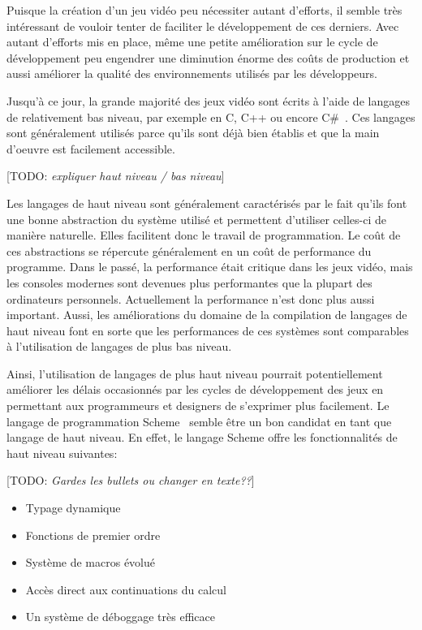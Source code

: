 \documentclass[12pt,oneside,letterpaper,francais]{book}
\newcommand{\todo}[1]{[TODO: {\it #1}]}
\begin{document}
Puisque la création d'un jeu vidéo peu nécessiter autant d'efforts, il
semble très intéressant de vouloir tenter de faciliter le
développement de ces derniers. Avec autant d'efforts mis en place,
même une petite amélioration sur le cycle de développement peu
engendrer une diminution énorme des coûts de production et aussi
améliorer la qualité des environnements utilisés par les développeurs.

Jusqu'à ce jour, la grande majorité des jeux vidéo sont écrits à
l'aide de langages de relativement bas niveau, par exemple en C, C++
ou encore C\#~\cite{CSHARP_SPEC}. Ces langages sont généralement
utilisés parce qu'ils sont déjà bien établis et que la main d'oeuvre
est facilement accessible.

\todo{expliquer haut niveau / bas niveau}

Les langages de haut niveau sont généralement caractérisés par le fait
qu'ils font une bonne abstraction du système utilisé et permettent
d'utiliser celles-ci de manière naturelle. Elles facilitent donc le
travail de programmation. Le coût de ces abstractions se répercute
généralement en un coût de performance du programme. Dans le passé, la
performance était critique dans les jeux vidéo, mais les consoles
modernes sont devenues plus performantes que la plupart des
ordinateurs personnels. Actuellement la performance n'est donc plus
aussi important. Aussi, les améliorations du domaine de la compilation
de langages de haut niveau font en sorte que les performances de ces
systèmes sont comparables à l'utilisation de langages de plus bas
niveau.

Ainsi, l'utilisation de langages de plus haut niveau pourrait
potentiellement améliorer les délais occasionnés par les cycles de
développement des jeux en permettant aux programmeurs et designers de
s'exprimer plus facilement. Le langage de programmation
Scheme~\cite{R5RS} semble être un bon candidat en tant que langage de
haut niveau. En effet, le langage Scheme offre les fonctionnalités de
haut niveau suivantes:

\todo{Gardes les bullets ou changer en texte??}

\begin{itemize}
\item Typage dynamique
\item Fonctions de premier ordre
\item Système de macros évolué
\item Accès direct aux continuations du calcul
\item Un système de déboggage très efficace
\end{itemize}
\end{document}
